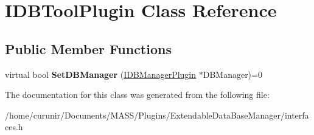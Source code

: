\hypertarget{class_i_d_b_tool_plugin}{}\section{I\+D\+B\+Tool\+Plugin Class Reference}
\label{class_i_d_b_tool_plugin}
\subsection*{Public Member Functions}
\begin{DoxyCompactItemize}
\item 
virtual bool {\bfseries Set\+D\+B\+Manager} (\hyperlink{class_i_d_b_manager_plugin}{I\+D\+B\+Manager\+Plugin} $\ast$D\+B\+Manager)=0\hypertarget{class_i_d_b_tool_plugin_ae7c5693728988f5aa46065fed7a8ca99}{}\label{class_i_d_b_tool_plugin_ae7c5693728988f5aa46065fed7a8ca99}

\end{DoxyCompactItemize}


The documentation for this class was generated from the following file\+:\begin{DoxyCompactItemize}
\item 
/home/curunir/\+Documents/\+M\+A\+S\+S/\+Plugins/\+Extendable\+Data\+Base\+Manager/interfaces.\+h\end{DoxyCompactItemize}
